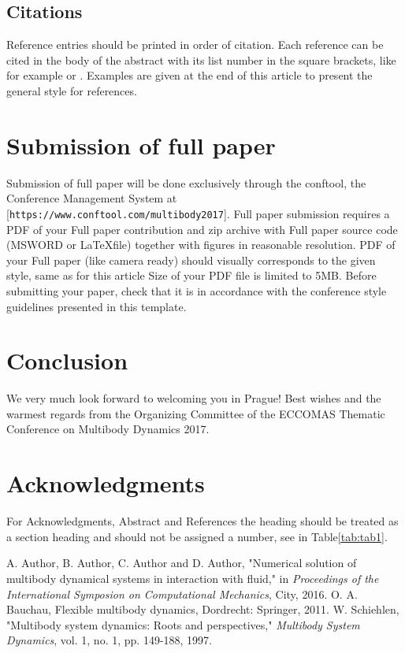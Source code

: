 \documentclass{mbd_fullpaper}
\begin{document}
\subsection{Citations}

Reference entries should be printed in order of citation. Each reference can be cited in the body of the abstract with its list number in the square brackets, like for example \cite{Schiehlen1997} or \cite{Author2016}. Examples are given at the end of this article to present the general style for references.

\section{Submission of full paper}

Submission of full paper will be done exclusively through the conftool, the Conference Management System at [\texttt{https://www.conftool.com/multibody2017}]. Full paper submission requires a PDF of your Full paper contribution and zip archive with Full paper source code (MSWORD or \LaTeX file) together with figures in reasonable resolution. PDF of your Full paper (like camera ready) should visually corresponds to the given style, same as for this article Size of your PDF file is limited to 5MB. Before submitting your paper, check that it is in accordance with the conference style guidelines presented in this template.

\section{Conclusion}
We very much look forward to welcoming you in Prague! Best wishes and the warmest regards from the Organizing Committee of the ECCOMAS Thematic Conference on Multibody Dynamics 2017.

\section*{Acknowledgments}

For Acknowledgments, Abstract and References the heading should be treated as a section heading and should not be assigned a number, see in Table\ref{tab:tab1}.


\begin{thebibliography}{mbd}

A. Author, B. Author, C. Author and D. Author, "Numerical solution of multibody dynamical systems in interaction with fluid," in \textit{Proceedings of the International Symposion on Computational Mechanics}, City, 2016.
O. A. Bauchau, Flexible multibody dynamics, Dordrecht: Springer, 2011.
W. Schiehlen, "Multibody system dynamics: Roots and perspectives," \textit{Multibody System Dynamics}, vol. 1, no. 1, pp. 149-188, 1997.

\end{thebibliography}
\end{document}
